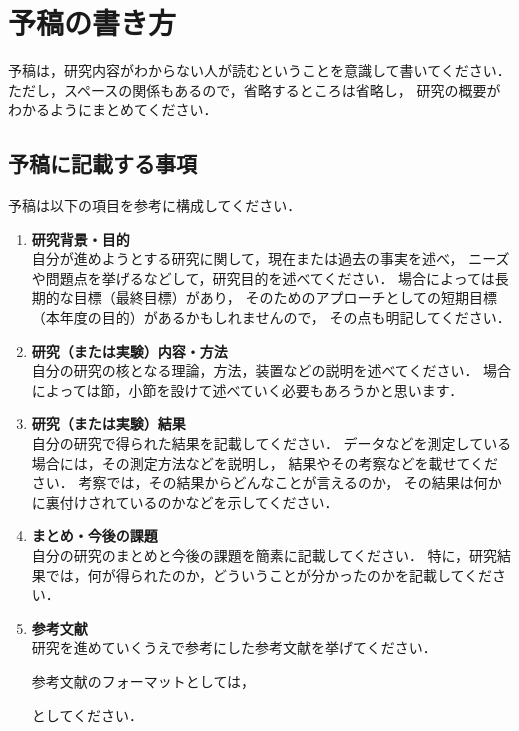 \documentclass[titlepage]{jarticle}
\begin{document}
\section{予稿の書き方}
%
予稿は，研究内容がわからない人が読むということを意識して書いてください．
ただし，スペースの関係もあるので，省略するところは省略し，
研究の概要がわかるようにまとめてください．
%
%
\subsection{予稿に記載する事項}
%
予稿は以下の項目を参考に構成してください．
%
\begin{enumerate}
  \item \textbf{研究背景・目的} \\
        自分が進めようとする研究に関して，現在または過去の事実を述べ，
        ニーズや問題点を挙げるなどして，研究目的を述べてください．
        場合によっては長期的な目標（最終目標）があり，
        そのためのアプローチとしての短期目標（本年度の目的）があるかもしれませんので，
        その点も明記してください．
  \item \textbf{研究（または実験）内容・方法} \\
        自分の研究の核となる理論，方法，装置などの説明を述べてください．
        場合によっては節，小節を設けて述べていく必要もあろうかと思います．
  \item \textbf{研究（または実験）結果} \\
        自分の研究で得られた結果を記載してください．
        データなどを測定している場合には，その測定方法などを説明し，
        結果やその考察などを載せてください．
        考察では，その結果からどんなことが言えるのか，
        その結果は何かに裏付けされているのかなどを示してください．
  \item \textbf{まとめ・今後の課題} \\
        自分の研究のまとめと今後の課題を簡素に記載してください．
        特に，研究結果では，何が得られたのか，どういうことが分かったのかを記載してください．
  \item \textbf{参考文献} \\
        研究を進めていくうえで参考にした参考文献を挙げてください．

        参考文献のフォーマットとしては，
        \renewcommand{\labelenumii}{[\arabic{enumii}]}
        \renewcommand{\labelenumii}{\arabic{enumii}}
        としてください．
\end{enumerate}
%
%
\end{document}
